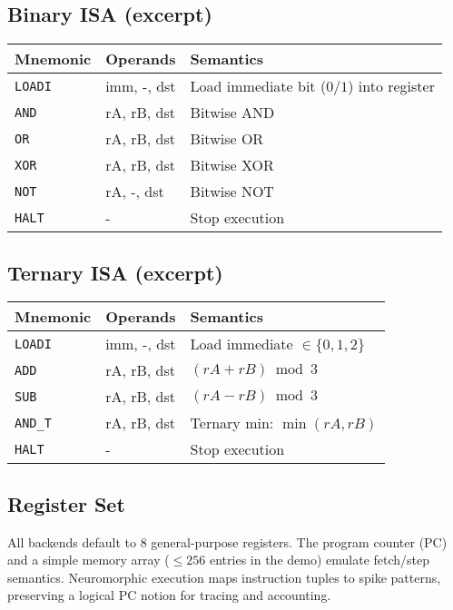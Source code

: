 \documentclass[11pt,a4paper]{article}
\newcommand{\code}[1]{\texttt{#1}}
\begin{document}
\subsection{Binary ISA (excerpt)}
\begin{center}
\begin{tabular}{@{}llp{8cm}@{}}
\toprule
Mnemonic & Operands & Semantics \\
\midrule
\code{LOADI} & imm, -, dst & Load immediate bit (\(0/1\)) into register \\
\code{AND} & rA, rB, dst & Bitwise AND \\
\code{OR} & rA, rB, dst & Bitwise OR \\
\code{XOR} & rA, rB, dst & Bitwise XOR \\
\code{NOT} & rA, -, dst & Bitwise NOT \\
\code{HALT} & - & Stop execution \\
\bottomrule
\end{tabular}
\end{center}

\subsection{Ternary ISA (excerpt)}
\begin{center}
\begin{tabular}{@{}llp{8cm}@{}}
\toprule
Mnemonic & Operands & Semantics \\
\midrule
\code{LOADI} & imm, -, dst & Load immediate \(\in \{0,1,2\}\) \\
\code{ADD} & rA, rB, dst & \((rA + rB) \bmod 3\) \\
\code{SUB} & rA, rB, dst & \((rA - rB) \bmod 3\) \\
\code{AND\_T} & rA, rB, dst & Ternary min: \(\min(rA,rB)\) \\
\code{HALT} & - & Stop execution \\
\bottomrule
\end{tabular}
\end{center}

\subsection{Register Set}
All backends default to 8 general-purpose registers. The program counter (PC)
and a simple memory array (\(\le 256\) entries in the demo) emulate fetch/step
semantics. Neuromorphic execution maps instruction tuples to spike patterns,
preserving a logical PC notion for tracing and accounting.
\end{document}

